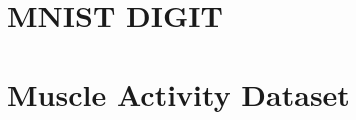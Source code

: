 \documentclass[a4paper,11pt,twoside]{report}
\begin{document}
	
	
	\tableofcontents
	\listoffigures

	
	\chapter{MNIST DIGIT}
	
	\chapter{Muscle Activity Dataset}
	\label{chap:kef2}
	


	

	
	
\end{document}

